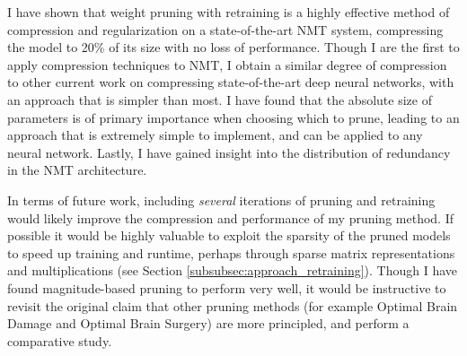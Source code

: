 I have shown that weight pruning with retraining is a highly effective method of compression and regularization on a state-of-the-art NMT system, compressing the model to 20\% of its size with no loss of performance. 
Though I are the first to apply compression techniques to NMT, I obtain a similar degree of compression to other current work on compressing state-of-the-art deep neural networks, with an approach that is simpler than most.
I have found that the absolute size of parameters is of primary importance when choosing which to prune, leading to an approach that is extremely simple to implement, and can be applied to any neural network.
Lastly, I have gained insight into the distribution of redundancy in the NMT architecture.

In terms of future work, including \emph{several} iterations of pruning and retraining would likely improve the compression and performance of my pruning method.
If possible it would be highly valuable to exploit the sparsity of the pruned
models to speed up training and runtime, perhaps through sparse matrix
representations and multiplications (see Section \ref{subsubsec:approach_retraining}).
Though I have found magnitude-based pruning to perform very well, it would be instructive to revisit the original claim that other pruning methods (for example Optimal Brain Damage and Optimal Brain Surgery) are more principled, and perform a comparative study.


